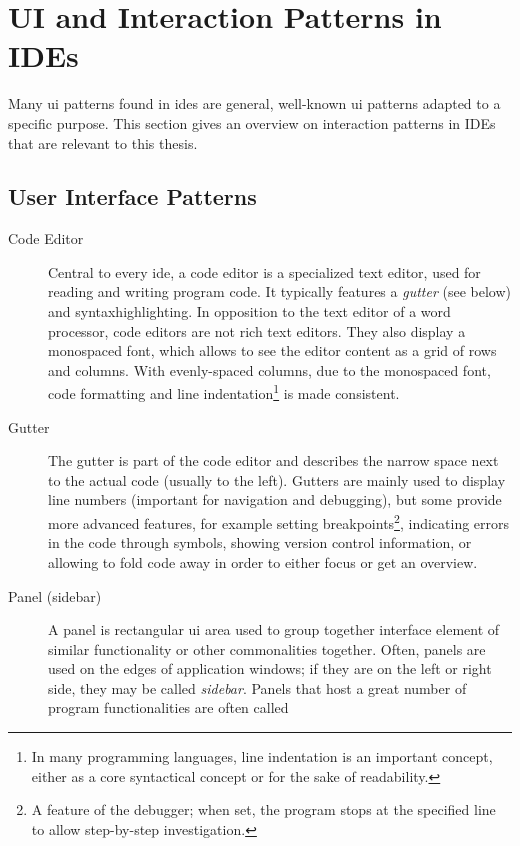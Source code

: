 \section{UI and Interaction Patterns in
IDEs}\label{ui-and-interaction-patterns-in-ides}

Many \acl{ui} patterns found in \glspl{ide} are general, well-known
\ac{ui} patterns adapted to a specific purpose. This section gives an
overview on interaction patterns in IDEs that are relevant to this
thesis.

\subsection{User Interface Patterns}\label{user-interface-patterns}

\begin{description}
\item[Code Editor]
Central to every \gls{ide}, a code editor is a specialized text editor,
used for reading and writing program code. It typically features a
\emph{gutter} (see below) and \gls{syntaxhighlighting}. In opposition to
the text editor of a word processor, code editors are not rich text
editors. They also display a monospaced font, which allows to see the
editor content as a grid of rows and columns. With evenly-spaced
columns, due to the monospaced font, code formatting and line
indentation\footnote{In many programming languages, line indentation is an important concept, either as a core syntactical concept or for the sake of readability.}
is made consistent.
\item[Gutter]
The gutter is part of the code editor and describes the narrow space
next to the actual code (usually to the left). Gutters are mainly used
to display line numbers (important for navigation and debugging), but
some provide more advanced features, for example setting
breakpoints\footnote{A feature of the debugger; when set, the program stops at the specified line to allow step-by-step investigation.},
indicating errors in the code through symbols, showing version control
information, or allowing to fold code away in order to either focus or
get an overview.
\item[Panel (sidebar)]
A panel is rectangular \ac{ui} area used to group together interface
element of similar functionality or other commonalities together. Often,
panels are used on the edges of application windows; if they are on the
left or right side, they may be called \emph{sidebar}. Panels that host
a great number of program functionalities are often called

\end{description}
